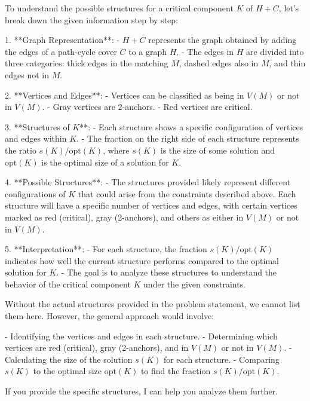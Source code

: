 To understand the possible structures for a critical component \( K \) of \( H + C \), let's break down the given information step by step:

1. **Graph Representation**:
   - \( H + C \) represents the graph obtained by adding the edges of a path-cycle cover \( C \) to a graph \( H \).
   - The edges in \( H \) are divided into three categories: thick edges in the matching \( M \), dashed edges also in \( M \), and thin edges not in \( M \).

2. **Vertices and Edges**:
   - Vertices can be classified as being in \( V(M) \) or not in \( V(M) \).
   - Gray vertices are 2-anchors.
   - Red vertices are critical.

3. **Structures of \( K \)**:
   - Each structure shows a specific configuration of vertices and edges within \( K \).
   - The fraction on the right side of each structure represents the ratio \( s(K) / \text{opt}(K) \), where \( s(K) \) is the size of some solution and \( \text{opt}(K) \) is the optimal size of a solution for \( K \).

4. **Possible Structures**:
   - The structures provided likely represent different configurations of \( K \) that could arise from the constraints described above. Each structure will have a specific number of vertices and edges, with certain vertices marked as red (critical), gray (2-anchors), and others as either in \( V(M) \) or not in \( V(M) \).

5. **Interpretation**:
   - For each structure, the fraction \( s(K) / \text{opt}(K) \) indicates how well the current structure performs compared to the optimal solution for \( K \).
   - The goal is to analyze these structures to understand the behavior of the critical component \( K \) under the given constraints.

Without the actual structures provided in the problem statement, we cannot list them here. However, the general approach would involve:

- Identifying the vertices and edges in each structure.
- Determining which vertices are red (critical), gray (2-anchors), and in \( V(M) \) or not in \( V(M) \).
- Calculating the size of the solution \( s(K) \) for each structure.
- Comparing \( s(K) \) to the optimal size \( \text{opt}(K) \) to find the fraction \( s(K) / \text{opt}(K) \).

If you provide the specific structures, I can help you analyze them further.
